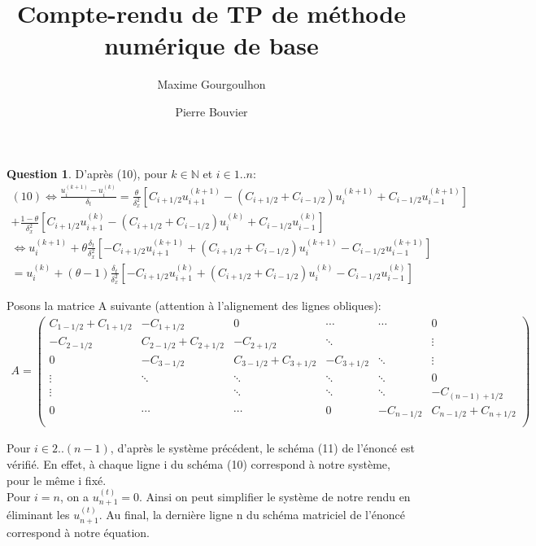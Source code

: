 \documentclass[a4paper]{article}
\title{Compte-rendu de TP de méthode numérique de base}
\author{Maxime Gourgoulhon \and Pierre Bouvier}
\theoremstyle{definition}
\newtheorem{que}{Question}
\begin{document}
	\maketitle
	\begin{que}
		D'après (10), pour $k \in \mathbb{N}$ et $i \in 1..n$:
		\begin{align*}
			(10) \Leftrightarrow \frac{u_i^{(k+1)} - u_i^{(k)}}{\delta_t} = \frac{\theta}{\delta_x^2} [C_{i+1/2}u_{i+1}^{(k+1)} - (C_{i+1/2} + C_{i-1/2})u_{i}^{(k+1)} + C_{i-1/2}u_{i-1}^{(k+1)}]
\\ + \frac{1-\theta}{\delta_x^2} [C_{i+1/2}u_{i+1}^{(k)} - (C_{i+1/2} + C_{i-1/2})u_{i}^{(k)} + C_{i-1/2}u_{i-1}^{(k)}] \\
\Leftrightarrow u_i^{(k+1)} + \theta\frac{\delta_t}{\delta_x^2} [-C_{i+1/2}u_{i+1}^{(k+1)} + (C_{i+1/2} + C_{i-1/2})u_{i}^{(k+1)} - C_{i-1/2}u_{i-1}^{(k+1)}] \\ =  u_i^{(k)}
+(\theta-1)\frac{\delta_t}{\delta_x^2}[-C_{i+1/2}u_{i+1}^{(k)} + (C_{i+1/2} + C_{i-1/2})u_{i}^{(k)} - C_{i-1/2}u_{i-1}^{(k)}]
		\end{align*}

		Posons la matrice A suivante (attention à l'alignement des lignes obliques):
		\begin{align*}
			A=
			\begin{pmatrix}
				C_{1-1/2} + C_{1+1/2} & - C_{1+1/2}  & 0 & \cdots & \cdots & 0 \\
				 - C_{2-1/2} & C_{2-1/2} + C_{2+1/2} & - C_{2+1/2}  & \ddots & ~ & \vdots\\
				0 & - C_{3-1/2} & C_{3-1/2} + C_{3+1/2} & - C_{3+1/2}  & \ddots & \vdots\\
				\vdots & \ddots & \ddots & \ddots & \ddots & 0\\
				\vdots & ~ & \ddots & \ddots & \ddots & - C_{(n-1)+1/2}\\
				0 & \cdots & \cdots & 0 & - C_{n-1/2} & C_{n-1/2} + C_{n+1/2} \\
			\end{pmatrix}
		\end{align*}

		Pour $i \in 2..(n-1)$, d'après le système précédent, le schéma (11) de l'énoncé est vérifié.
		En effet, à chaque ligne i du schéma (10) correspond à notre système, pour le même i fixé.\\

		Pour $i = n$, on a $u_{n+1}^{(t)} = 0$. Ainsi on peut simplifier le système de notre rendu en éliminant les $u_{n+1}^{(t)}$.
		Au final, la dernière ligne n du schéma matriciel de l'énoncé correspond à notre équation. \\


\end{que}
\end{document}
